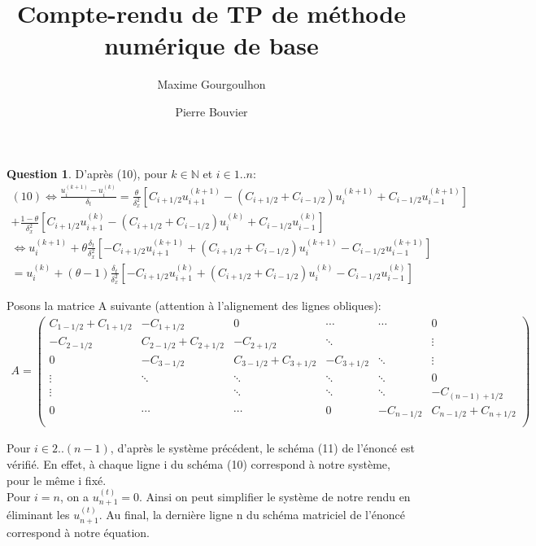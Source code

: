 \documentclass[a4paper]{article}
\title{Compte-rendu de TP de méthode numérique de base}
\author{Maxime Gourgoulhon \and Pierre Bouvier}
\theoremstyle{definition}
\newtheorem{que}{Question}
\begin{document}
	\maketitle
	\begin{que}
		D'après (10), pour $k \in \mathbb{N}$ et $i \in 1..n$:
		\begin{align*}
			(10) \Leftrightarrow \frac{u_i^{(k+1)} - u_i^{(k)}}{\delta_t} = \frac{\theta}{\delta_x^2} [C_{i+1/2}u_{i+1}^{(k+1)} - (C_{i+1/2} + C_{i-1/2})u_{i}^{(k+1)} + C_{i-1/2}u_{i-1}^{(k+1)}]
\\ + \frac{1-\theta}{\delta_x^2} [C_{i+1/2}u_{i+1}^{(k)} - (C_{i+1/2} + C_{i-1/2})u_{i}^{(k)} + C_{i-1/2}u_{i-1}^{(k)}] \\
\Leftrightarrow u_i^{(k+1)} + \theta\frac{\delta_t}{\delta_x^2} [-C_{i+1/2}u_{i+1}^{(k+1)} + (C_{i+1/2} + C_{i-1/2})u_{i}^{(k+1)} - C_{i-1/2}u_{i-1}^{(k+1)}] \\ =  u_i^{(k)}
+(\theta-1)\frac{\delta_t}{\delta_x^2}[-C_{i+1/2}u_{i+1}^{(k)} + (C_{i+1/2} + C_{i-1/2})u_{i}^{(k)} - C_{i-1/2}u_{i-1}^{(k)}]
		\end{align*}

		Posons la matrice A suivante (attention à l'alignement des lignes obliques):
		\begin{align*}
			A=
			\begin{pmatrix}
				C_{1-1/2} + C_{1+1/2} & - C_{1+1/2}  & 0 & \cdots & \cdots & 0 \\
				 - C_{2-1/2} & C_{2-1/2} + C_{2+1/2} & - C_{2+1/2}  & \ddots & ~ & \vdots\\
				0 & - C_{3-1/2} & C_{3-1/2} + C_{3+1/2} & - C_{3+1/2}  & \ddots & \vdots\\
				\vdots & \ddots & \ddots & \ddots & \ddots & 0\\
				\vdots & ~ & \ddots & \ddots & \ddots & - C_{(n-1)+1/2}\\
				0 & \cdots & \cdots & 0 & - C_{n-1/2} & C_{n-1/2} + C_{n+1/2} \\
			\end{pmatrix}
		\end{align*}

		Pour $i \in 2..(n-1)$, d'après le système précédent, le schéma (11) de l'énoncé est vérifié.
		En effet, à chaque ligne i du schéma (10) correspond à notre système, pour le même i fixé.\\

		Pour $i = n$, on a $u_{n+1}^{(t)} = 0$. Ainsi on peut simplifier le système de notre rendu en éliminant les $u_{n+1}^{(t)}$.
		Au final, la dernière ligne n du schéma matriciel de l'énoncé correspond à notre équation. \\


\end{que}
\end{document}
